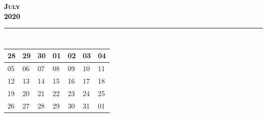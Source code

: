 \documentclass{article}
\newcommand{\daysize}{2.5cm}		%
\newcommand{\dw}{3.5cm}					%
\newcommand{\mkday}[1]{
  #1
  \vspace{\daysize}
}
\begin{document}
		\begin{center}
			\textsc{\LARGE \textbf{\textcolor{black}{
			July
			}}}\\ %
			\textsc{\large \textbf{\textcolor{black}{
			2020
			}}} %
		\end{center}

		\begin{center}
		\begin{tabular}{| p{\dw} | p{\dw} | p{\dw} | p{\dw} | p{\dw} | p{\dw} | p{\dw} |}
			\hline
			\cellcolor{bannercolor} \textcolor{white}{Sunday} &
			\cellcolor{bannercolor} \textcolor{white}{Monday} &
			\cellcolor{bannercolor} \textcolor{white}{Tuesday} &
			\cellcolor{bannercolor} \textcolor{white}{Wednesday} &
			\cellcolor{bannercolor} \textcolor{white}{Thursday} &
			\cellcolor{bannercolor} \textcolor{white}{Friday} &
			\cellcolor{bannercolor} \textcolor{white}{Saturday} \\
			\hline
		\end{tabular}

		\vspace{0.1cm}

		\begin{tabular}{| p{\dw} | p{\dw} | p{\dw} | p{\dw} | p{\dw} | p{\dw} | p{\dw} |}
\hline 
\cellcolor{weekendcolor}\mkday{
    28
} & 
\mkday{
    29
} &
\mkday{
    30
} &
\mkday{
    01
} &
\mkday{
    02
} &
\mkday{
    03
} &
\cellcolor{weekendcolor}\mkday{
    04
} 
\\
\hline 
\cellcolor{weekendcolor}\mkday{
    05
} & 
\mkday{
    06
} &
\mkday{
    07
} &
\mkday{
    08
} &
\mkday{
    09
} &
\mkday{
    10
} &
\cellcolor{weekendcolor}\mkday{
    11
} 
\\
\hline 
\cellcolor{weekendcolor}\mkday{
    12
} & 
\mkday{
    13
} &
\mkday{
    14
} &
\mkday{
    15
} &
\mkday{
    16
} &
\mkday{
    17
} &
\cellcolor{weekendcolor}\mkday{
    18
} 
\\
\hline 
\cellcolor{weekendcolor}\mkday{
    19
} & 
\mkday{
    20
} &
\mkday{
    21
} &
\mkday{
    22
} &
\mkday{
    23
} &
\mkday{
    24
} &
\cellcolor{weekendcolor}\mkday{
    25
} 
\\
\hline 
\cellcolor{weekendcolor}\mkday{
    26
} & 
\mkday{
    27
} &
\mkday{
    28
} &
\mkday{
    29
} &
\mkday{
    30
} &
\mkday{
    31
} &
\cellcolor{weekendcolor}\mkday{
    01
} 
\\
		\end{tabular}

		\end{center}
\end{document}
